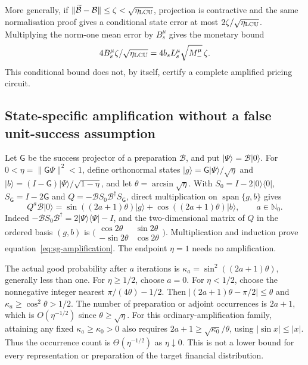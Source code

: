 More generally, if
$\|\widetilde{\mathcal B}-\mathcal B\|\leq\zeta<\sqrt{\eta_{\rm LCU}}$,
projection is contractive and the same normalisation proof gives
a conditional state error at most $2\zeta/\sqrt{\eta_{\rm LCU}}$.
Multiplying the norm-one mean error by $B_s^\mu$ gives the monetary
bound
\[
 4B_s^\mu\zeta/\sqrt{\eta_{\rm LCU}}
       =4b_sL_s^\mu\sqrt{M_-^\mu}\,\zeta.
\]
This conditional bound does not, by itself, certify a complete
amplified pricing circuit.

\subsection{State-specific amplification without a false unit-success assumption}

Let $\mathsf G$ be the success projector of a preparation $\mathcal B$,
and put $|\Psi\rangle=\mathcal B|0\rangle$.
For $0<\eta=\|\mathsf G\Psi\|^2<1$, define orthonormal states
$|g\rangle=\mathsf G|\Psi\rangle/\sqrt\eta$ and
$|b\rangle=(I-\mathsf G)|\Psi\rangle/\sqrt{1-\eta}$, and let
$\theta=\arcsin\sqrt\eta$.
With
$S_0=I-2|0\rangle\langle0|$,
$S_{\mathsf G}=I-2\mathsf G$ and
$Q=-\mathcal B S_0\mathcal B^\dagger S_{\mathsf G}$,
direct multiplication on $\operatorname{span}\{g,b\}$ gives
\begin{equation}
 Q^a\mathcal B|0\rangle
   =\sin((2a+1)\theta)|g\rangle+
             \cos((2a+1)\theta)|b\rangle,\qquad a\in\mathbb N_0.
 \label{eq:sg-amplification}
\end{equation}
Indeed $-\mathcal B S_0\mathcal B^\dagger=2|\Psi\rangle
\langle\Psi|-I$, and the two-dimensional matrix of $Q$ in the ordered
basis $(g,b)$ is
$\bigl(\begin{smallmatrix}\cos2\theta&\sin2\theta\\
-\sin2\theta&\cos2\theta\end{smallmatrix}\bigr)$.
Multiplication and induction prove equation~\eqref{eq:sg-amplification}.
The endpoint $\eta=1$ needs no amplification.

The actual good probability after $a$ iterations is
$\kappa_a=\sin^2((2a+1)\theta)$, generally less than one.
For $\eta\geq1/2$, choose $a=0$. For $\eta<1/2$, choose the
nonnegative integer nearest $\pi/(4\theta)-1/2$.
Then $|(2a+1)\theta-\pi/2|\leq\theta$ and
$\kappa_a\geq\cos^2\theta>1/2$.
The number of preparation or adjoint occurrences is $2a+1$,
which is $O(\eta^{-1/2})$ since $\theta\geq\sqrt\eta$.
For this ordinary-amplification family, attaining any fixed
$\kappa_a\geq\kappa_0>0$ also requires
$2a+1\geq\sqrt{\kappa_0}/\theta$, using $|\sin x|\leq|x|$.
Thus the occurrence count is $\Theta(\eta^{-1/2})$ as $\eta\downarrow0$.
This is not a lower bound for every representation or preparation of
the target financial distribution.

